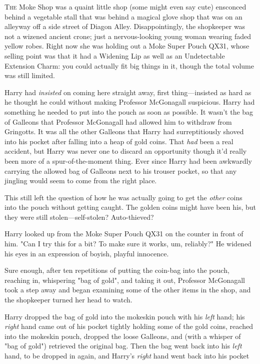 
\lettrine{T}{he} Moke Shop was a quaint little shop (some might even say cute) ensconced
behind a vegetable stall that was behind a magical glove shop that was on an
alleyway off a side street of Diagon Alley. Disappointingly, the shopkeeper was
not a wizened ancient crone; just a nervous-looking young woman wearing faded
yellow robes. Right now she was holding out a Moke Super Pouch QX31, whose
selling point was that it had a Widening Lip as well as an Undetectable
Extension Charm: you could actually fit big things in it, though the total
volume was still limited.

Harry had \emph{insisted} on coming here straight away, first thing—insisted
as hard as he thought he could without making Professor McGonagall suspicious.
Harry had something he needed to put into the pouch as soon as possible. It
wasn't the bag of Galleons that Professor McGonagall had allowed him to
withdraw from Gringotts. It was all the other Galleons that Harry had
surreptitiously shoved into his pocket after falling into a heap of gold coins.
That \emph{had} been a real accident, but Harry was never one to discard an
opportunity{\el} though it'd really been more of a spur-of-the-moment thing.
Ever since Harry had been awkwardly carrying the allowed bag of Galleons next
to his trouser pocket, so that any jingling would seem to come from the right
place.

This still left the question of how he was actually going to get the
\emph{other} coins into the pouch without getting caught. The golden coins
might have been his, but they were still stolen—self-stolen? Auto-thieved?

Harry looked up from the Moke Super Pouch QX31 on the counter in front of him.
"Can I try this for a bit? To make sure it works, um, reliably?" He widened his
eyes in an expression of boyish, playful innocence.

Sure enough, after ten repetitions of putting the coin-bag into the pouch,
reaching in, whispering "bag of gold", and taking it out, Professor McGonagall
took a step away and began examining some of the other items in the shop, and
the shopkeeper turned her head to watch.

Harry dropped the bag of gold into the mokeskin pouch with his \emph{left}
hand; his \emph{right} hand came out of his pocket tightly holding some of the
gold coins, reached into the mokeskin pouch, dropped the loose Galleons, and
(with a whisper of "bag of gold") retrieved the original bag. Then the bag went
back into his \emph{left} hand, to be dropped in again, and Harry's
\emph{right} hand went back into his pocket{\el}

